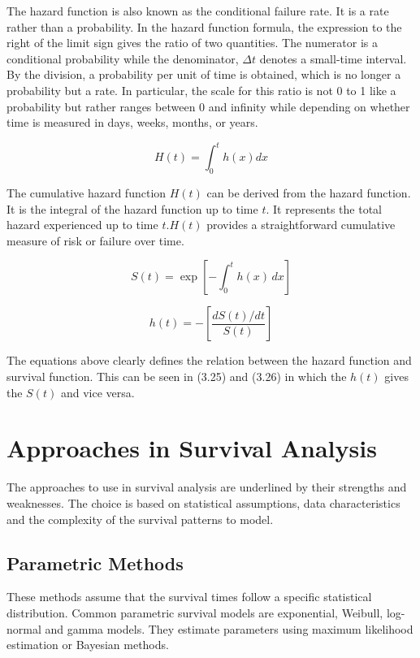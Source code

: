 \documentclass[doublespacing]{report} [12px]%
\begin{document}
The hazard function is also known as the conditional failure rate. It is a rate rather than a probability. In the hazard function formula, the expression to the right of the limit sign gives the ratio of two quantities. The numerator is a conditional probability while the denominator, \(\Delta t\) denotes a small-time interval. By the division, a probability per unit of time is obtained, which is no longer a probability but a rate. In particular, the scale for this ratio is not 0 to 1 like a probability but rather ranges between 0 and infinity while depending on whether time is measured in days, weeks, months, or years. 

\begin{equation}
H(t)=\int_{0}^{t}{h(x)dx}
\end{equation}

The cumulative hazard function \(H(t)\) can be derived from the hazard function. It is the integral of the hazard function up to time \(t\). It represents the total hazard experienced up to time \( t. H(t)\) provides a straightforward cumulative measure of risk or failure over time.

\begin{equation}
S(t) = \exp\left[-\int_{0}^{t} h(x) \, dx\right]
\label{eq:survival_function}
\end{equation}

\begin{equation}
h(t) = -\left[\frac{dS(t)/dt}{S(t)}\right]
\end{equation}

The equations above clearly defines the relation between the hazard function and survival function. This can be seen in (3.25) and (3.26) in which the $h(t)$ gives the $S(t)$ and vice versa.


\section{Approaches in Survival Analysis}

The approaches to use in survival analysis are underlined by their strengths and weaknesses. The choice is based on statistical assumptions, data characteristics and the complexity of the survival patterns to model.

\subsection{Parametric Methods}

These methods assume that the survival times follow a specific statistical distribution. Common parametric survival models are exponential, Weibull, log-normal and gamma models. They estimate parameters using maximum likelihood estimation or Bayesian methods.
\end{document}

